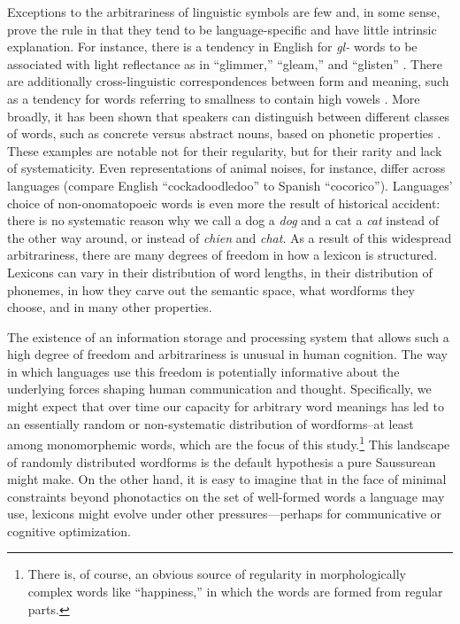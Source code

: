 \documentclass{article}
\begin{document}
Exceptions to the arbitrariness of linguistic symbols are few and, in
some sense, prove the rule in that they tend to be language-specific
and have little intrinsic explanation. For instance, there is a
tendency in English for \textit{gl-} words to be associated with light
reflectance as in ``glimmer,'' ``gleam,'' and ``glisten''
\citep{bergen_psychological_2004}. There are additionally
cross-linguistic correspondences between form and meaning, such as a
tendency for words referring to smallness to contain high vowels
\citep{hinton2006sound,sapir1929study}. More broadly, it has been
shown that speakers can distinguish between different classes of
words, such as concrete versus abstract nouns, based on phonetic
properties \citep{reilly_arbitrary_2012}. These examples are notable
not for their regularity, but for their rarity and lack of
systematicity. Even representations of animal noises, for instance,
differ across languages (compare English ``cockadoodledoo'' to Spanish
``cocorico''). Languages' choice of non-onomatopoeic words is even
more the result of historical accident: there is no systematic reason
why we call a dog a \textit{dog} and a cat a \textit{cat} instead of
the other way around, or instead of \textit{chien} and \textit{chat}.
As a result of this widespread arbitrariness, there are many degrees
of freedom in how a lexicon is structured. Lexicons can vary in their
distribution of word lengths, in their distribution of phonemes, in
how they carve out the semantic space, what wordforms they choose, and
in many other properties.

The existence of an information storage and processing system that allows such a high degree of freedom and
arbitrariness is unusual in human cognition. The way in which languages use this freedom is potentially
informative about the underlying forces shaping human communication and thought. Specifically, we might expect
that over time our capacity for arbitrary word meanings has led to an essentially random or non-systematic
distribution of wordforms--at least among monomorphemic words, which are the focus of this
study.\footnote{There is, of course, an obvious source of regularity in morphologically complex words like
``happiness,'' in which the words are formed from regular parts.} This landscape of randomly distributed
wordforms is the default hypothesis a pure Saussurean might make. On the other hand, it is easy to imagine
that in the face of minimal constraints beyond phonotactics on the set of well-formed words a language may
use, lexicons might evolve under other pressures---perhaps for communicative or cognitive optimization.
\end{document}
